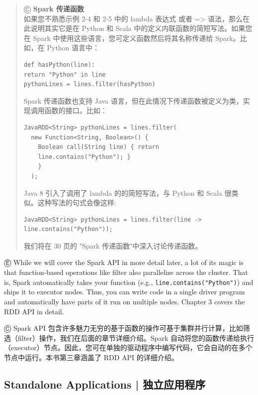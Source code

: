 \begin{quote}

Ⓒ \textbf{Spark 传递函数}\\
如果您不熟悉示例 2-4 和 2-5 中的 lambda 表达式 或者 =\textgreater{}
语法，那么在 此说明其实它是在 Python 和 Scala
中的定义内联函数的简短写法。如果您 在 Spark
中使用这些语言，您可定义函数然后将其名称传递给 Spark。比 如，在 Python
语言中：

\begin{lstlisting}
def hasPython(line):
return "Python" in line
pythonLines = lines.filter(hasPython)
\end{lstlisting}

Spark 传递函数也支持 Java 语言，但在此情况下传递函数被定义为类，实
现调用函数的接口。比如：

\begin{lstlisting}
JavaRDD<String> pythonLines = lines.filter(
  new Function<String, Boolean>() {
    Boolean call(String line) { return
    line.contains("Python"); }
    }
  );
\end{lstlisting}

Java 8 引入了调用了 lambda 的的简短写法，与 Python 和 Scala 很类
似。这种写法的句式会像这样:

\begin{lstlisting}
JavaRDD<String> pythonLines = lines.filter(line ->
line.contains("Python"));
\end{lstlisting}

我们将在 30 页的 "Spark 传递函数"中深入讨论传递函数。

\end{quote}


Ⓔ \textcolor{etc}{While we will cover the Spark API in more detail later, a lot of its magic is that function-based operations like filter also parallelize
across the cluster. That is, Spark automatically takes your function
(e.g., \lstinline{line.contains("Python")}) and ships it to executor nodes. Thus, you can write code in a single driver program and automatically have
parts of it run on multiple nodes. Chapter 3 covers the RDD API in
detail.}

Ⓒ Spark API
包含许多魅力无穷的基于函数的操作可基于集群并行计算，比如筛选（filter）操作，我们在后面的章节详细介绍。Spark
自动将您的函数传递给执行（executor）节点。因此，您可在单独的驱动程序中编写代码，它会自动的在多个节点中运行。本书第三章涵盖了
RDD API 的详细介绍。

\subsection{Standalone Applications  |  独立应用程序} \label{standalone-applications}

